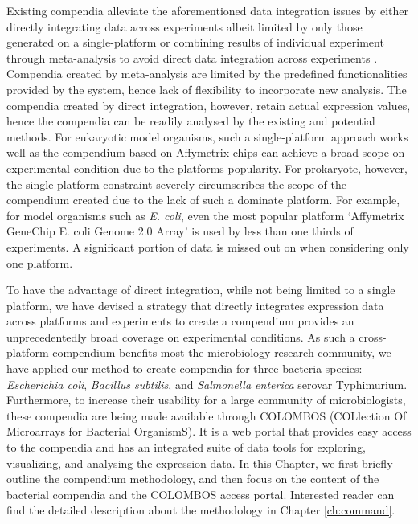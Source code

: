 Existing compendia alleviate the aforementioned data integration issues by 
either directly integrating data across experiments albeit limited by only 
those generated on a single-platform \cite{Faith2008, Hruz2008} 
or combining results of individual experiment through meta-analysis to avoid 
direct data integration across experiments 
\cite{Rhodes2007, Pan2007, Elfilali2006, Kapushesky2010}.
Compendia created by meta-analysis are limited by the predefined  
functionalities provided by the system, hence lack of flexibility to 
incorporate new analysis.
The compendia created by direct integration, however, retain actual expression 
values, hence the compendia can be readily analysed by the existing and 
potential methods.
For eukaryotic model organisms, such a single-platform approach works well 
as the compendium based on Affymetrix chips can achieve a broad scope on 
experimental condition due to the platforms popularity.
For prokaryote, however, the single-platform constraint severely circumscribes 
the scope of the compendium created due to the lack of such a dominate platform.
For example, for model organisms such as {\it E. coli}, even the most popular 
platform `Affymetrix GeneChip E. coli Genome 2.0 Array' is used by less than 
one thirds of experiments. A significant portion of data is missed out on 
when considering only one platform.

To have the advantage of direct integration, while not being limited to a 
single platform, we have devised a strategy that directly integrates expression 
data across platforms and experiments to create a compendium provides an 
unprecedentedly broad coverage on experimental conditions.
As such a cross-platform compendium benefits most the microbiology research 
community, we have applied our method to create compendia for three 
bacteria species: \textit{Escherichia coli}, \textit{Bacillus 
subtilis}, and \textit{Salmonella enterica} serovar Typhimurium.  
Furthermore, to increase their usability for a large community of 
microbiologists, these compendia are being made available through COLOMBOS 
(COLlection Of Microarrays for Bacterial OrganismS). 
It is a web portal that provides easy access to the compendia and has an 
integrated suite of data tools for exploring, visualizing, and analysing the 
expression data.
In this Chapter, we first briefly outline the compendium methodology, and then 
focus on the content of the bacterial compendia and the COLOMBOS access portal. 
Interested reader can find the detailed description about the methodology in 
Chapter \ref{ch:command}.



